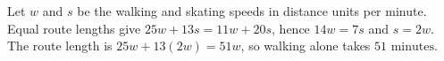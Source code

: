 Let $w$ and $s$ be the walking and skating speeds in distance units per minute. Equal route lengths give $25w+13s=11w+20s$, hence $14w=7s$ and $s=2w$. The route length is $25w+13(2w)=51w$, so walking alone takes $\boxed{51\text{ minutes}}$.
